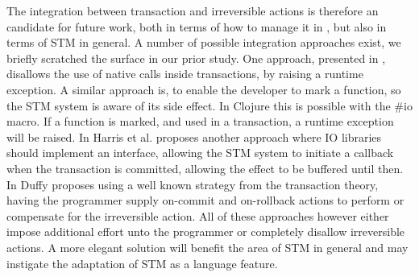 The integration between transaction and irreversible actions is therefore an candidate for future work, both in terms of how to manage it in \stmname, but also in terms of \ac{STM} in general. A number of possible integration approaches exist, we briefly scratched the surface in our prior study\cite[p. 51-52]{dpt907e14trending}. One approach, presented in \cite[p. 4]{harris2003language}, disallows the use of native calls inside transactions, by raising a runtime exception. A similar approach is, to enable the developer to mark a function, so the \ac{STM} system is aware of its side effect. In Clojure this is possible with the \#io macro. If a function is marked, and used in a transaction, a runtime exception will be raised. In \cite{harris2005exceptions} Harris et al. proposes another approach where \ac{IO} libraries should implement an interface, allowing the \ac{STM} system to initiate a callback when the transaction is committed, allowing the effect to be buffered until then. In \cite{duffy2010stmnet} Duffy proposes using a well known strategy from the transaction theory\cite{reuter1993transaction}, having the programmer supply on-commit and on-rollback actions to perform or compensate for the irreversible action. All of these approaches however either impose additional effort unto the programmer or completely disallow irreversible actions. A more elegant solution will benefit the area of \ac{STM} in general and may instigate the adaptation of \ac{STM} as a language feature.

\worksheetend
